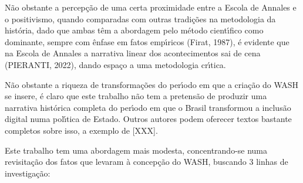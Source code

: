 \documentclass[
12pt,		%
openright,	%
twoside,  %
a4paper,			%
chapter=TITLE,		%
english,			%
french,				%
spanish,			%
brazil				%
]{USPSC-classe/USPSC_RedarTex}
\begin{document}
\noindent\begin{center}\mbox{\centering{}}\end{center}


N\~ao obstante a percep\c{c}\~ao de uma certa proximidade entre a Escola de Annales e o positivismo, quando comparadas com outras tradi\c{c}\~oes na metodologia da hist\'oria, dado que ambas t\^em a abordagem pelo m\'etodo cient\'{\i}fico como dominante, sempre com \^enfase em fatos emp\'{\i}ricos (Firat, 1987), \'e evidente que na Escola de Annales a narrativa linear dos acontecimentos sai de cena (PIERANTI, 2022), dando espa\c{c}o a uma metodologia cr\'{\i}tica.








N\~ao obstante a riqueza de transforma\c{c}\~oes do per\'{\i}odo em que a cria\c{c}\~ao do WASH se insere, \'e claro que este trabalho n\~ao tem a pretens\~ao de produzir uma narrativa hist\'orica completa do per\'{\i}odo em que o Brasil transformou a inclus\~ao digital numa pol\'{\i}tica de Estado. Outros autores podem oferecer textos bastante completos sobre isso, a exemplo de [XXX].








Este trabalho tem uma abordagem mais modesta, concentrando-se numa revisita\c{c}\~ao dos fatos que levaram \`a concep\c{c}\~ao do WASH, buscando 3 linhas de investiga\c{c}\~ao:
\end{document}
